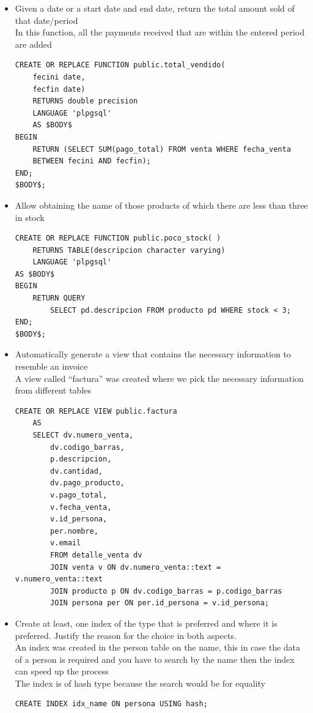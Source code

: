 \documentclass{article}
\begin{document}
\begin{itemize}
\item Given a date or a start date and end date, return the total amount sold of that date/period\\

In this function, all the payments received that are within the entered period are added \\

\begin{lstlisting}
CREATE OR REPLACE FUNCTION public.total_vendido(
	fecini date,
	fecfin date)
	RETURNS double precision
	LANGUAGE 'plpgsql'
	AS $BODY$
BEGIN
	RETURN (SELECT SUM(pago_total) FROM venta WHERE fecha_venta 
	BETWEEN fecini AND fecfin);
END;
$BODY$;
\end{lstlisting}

\item Allow obtaining the name of those products of which there are less than three in stock\\

\begin{lstlisting}
CREATE OR REPLACE FUNCTION public.poco_stock( )
	RETURNS TABLE(descripcion character varying)
	LANGUAGE 'plpgsql'
AS $BODY$
BEGIN
	RETURN QUERY
		SELECT pd.descripcion FROM producto pd WHERE stock < 3;
END;
$BODY$;
\end{lstlisting}

\item Automatically generate a view that contains the necessary information to resemble an invoice\\

A view called “factura” was created where we pick the necessary information from different tables\\

\begin{lstlisting}
CREATE OR REPLACE VIEW public.factura
	AS
	SELECT dv.numero_venta,
		dv.codigo_barras,
		p.descripcion,
		dv.cantidad,
		dv.pago_producto,
		v.pago_total,
		v.fecha_venta,
		v.id_persona,
		per.nombre,
		v.email
		FROM detalle_venta dv
		JOIN venta v ON dv.numero_venta::text = v.numero_venta::text
		JOIN producto p ON dv.codigo_barras = p.codigo_barras
		JOIN persona per ON per.id_persona = v.id_persona;
\end{lstlisting}

\item Create at least, one index of the type that is preferred and where it is preferred. Justify the reason for the choice in both aspects.\\

An index was created in the person table on the name, this in case the data of a person is required and you have to search by the name then the index can speed up the process \\

The index is of hash type because the search would be for equality \\

\begin{lstlisting}
CREATE INDEX idx_name ON persona USING hash;
\end{lstlisting}
\end{itemize}
\end{document}
